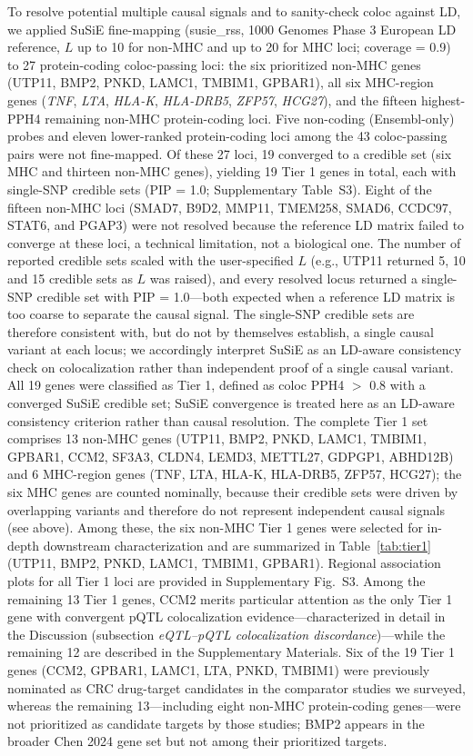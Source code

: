 \documentclass[11pt,a4paper]{article}
\begin{document}
To resolve potential multiple causal signals and to sanity-check coloc against LD,
we applied SuSiE fine-mapping (susie\_rss, 1000 Genomes Phase 3 European LD
reference, $L$ up to 10 for non-MHC and up to 20 for MHC loci; coverage = 0.9) to
27 protein-coding coloc-passing loci: the six prioritized non-MHC genes (UTP11,
BMP2, PNKD, LAMC1, TMBIM1, GPBAR1), all six MHC-region genes (\textit{TNF},
\textit{LTA}, \textit{HLA-K}, \textit{HLA-DRB5}, \textit{ZFP57}, \textit{HCG27}),
and the fifteen highest-PPH4 remaining non-MHC protein-coding loci. Five
non-coding (Ensembl-only) probes and eleven lower-ranked protein-coding loci among
the 43 coloc-passing pairs were not fine-mapped. Of these 27 loci, 19 converged to
a credible set (six MHC and thirteen non-MHC genes), yielding 19 Tier 1 genes in
total, each with single-SNP credible sets (PIP = 1.0; Supplementary Table~S3).
Eight of the fifteen non-MHC loci (SMAD7, B9D2, MMP11, TMEM258, SMAD6, CCDC97,
STAT6, and PGAP3) were not resolved because the reference LD matrix failed to
converge at these loci, a technical limitation, not a biological one.
The number of reported credible sets scaled with the user-specified $L$ (e.g., UTP11
returned 5, 10 and 15 credible sets as $L$ was raised), and every resolved locus
returned a single-SNP credible set with PIP = 1.0---both expected when a reference
LD matrix is too coarse to separate the causal signal. The single-SNP credible sets
are therefore consistent with, but do not by themselves establish, a single causal
variant at each locus; we accordingly interpret SuSiE as an LD-aware consistency
check on colocalization rather than independent proof of a single causal variant.
All 19 genes were classified as Tier 1, defined as coloc PPH4 $>$ 0.8 with a
converged SuSiE credible set; SuSiE convergence is treated here as an LD-aware
consistency criterion rather than causal resolution. The complete Tier 1 set
comprises 13 non-MHC genes (UTP11, BMP2, PNKD, LAMC1, TMBIM1, GPBAR1, CCM2,
SF3A3, CLDN4, LEMD3, METTL27, GDPGP1, ABHD12B) and 6 MHC-region genes (TNF, LTA,
HLA-K, HLA-DRB5, ZFP57, HCG27); the six MHC genes are counted nominally, because
their credible sets were driven by overlapping variants and therefore do not
represent independent causal signals (see above). Among these, the six non-MHC
Tier 1 genes were selected for in-depth downstream characterization and are
summarized in Table~\ref{tab:tier1} (UTP11, BMP2, PNKD, LAMC1, TMBIM1, GPBAR1). Regional association plots for all Tier 1 loci are provided in Supplementary Fig.~S3. Among the
remaining 13 Tier 1 genes, CCM2 merits particular attention as the only Tier 1
gene with convergent pQTL colocalization evidence---characterized in detail in the
Discussion (subsection \emph{eQTL--pQTL colocalization discordance})---while the
remaining 12 are described in the Supplementary Materials. Six of the 19 Tier 1
genes (CCM2, GPBAR1, LAMC1, LTA, PNKD, TMBIM1) were previously nominated as CRC
drug-target candidates in the comparator studies we surveyed, whereas the
remaining 13---including eight non-MHC protein-coding genes---were not prioritized as candidate targets by those studies; BMP2 appears in the broader Chen 2024 gene set but not among their prioritized targets.
\end{document}
